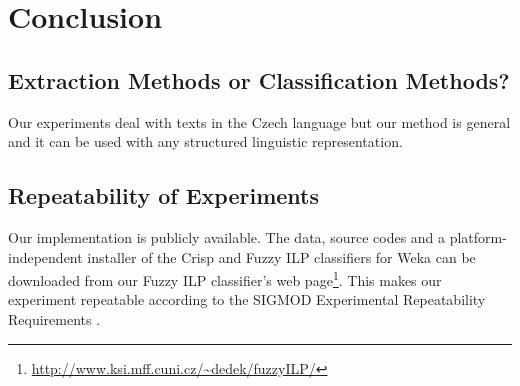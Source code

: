 \chapter{Conclusion}

\section{Extraction Methods or Classification Methods?}


Our experiments deal with texts in the Czech language but our method is general and it can be used with any structured linguistic representation. 

\section{Repeatability of Experiments} \label{sec:ch90_repeatablity}


Our implementation is publicly available. The data, source codes and a platform-independent installer of the Crisp and Fuzzy ILP classifiers for Weka can be downloaded from our Fuzzy ILP classifier's web page\footnote{\url{http://www.ksi.mff.cuni.cz/~dedek/fuzzyILP/}}. This makes our experiment repeatable according to the
SIGMOD Experimental Repeatability Requirements \citep{biblio:SIGMODrepeatability}.

